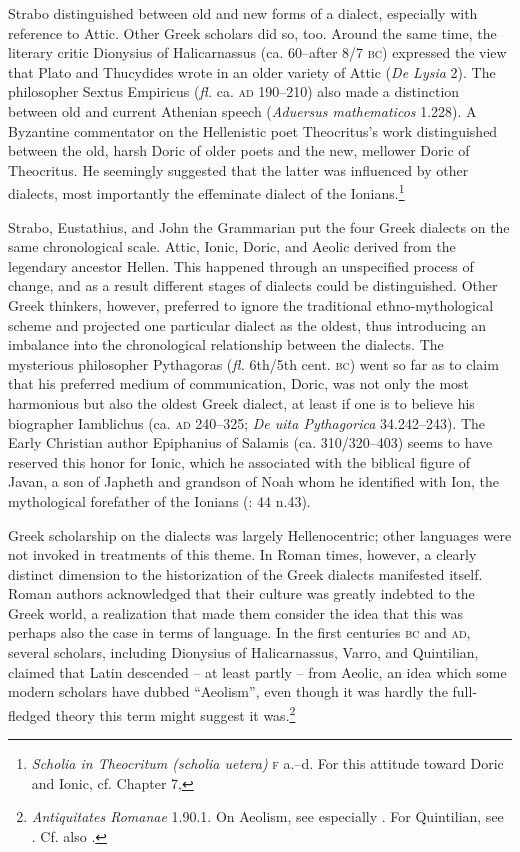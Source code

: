Strabo distinguished between old and new forms of a dialect, especially with reference to Attic. Other Greek scholars did so, too. Around the same time, the literary critic Dionysius of Halicarnassus (ca. 60–after 8/7 \textsc{bc}) expressed the view that Plato and Thucydides wrote in an older variety of Attic (\textit{De Lysia} 2). The philosopher Sextus Empiricus (\textit{fl.} ca. \textsc{ad} 190–210) also made a distinction between old and current Athenian speech (\textit{Aduersus mathematicos} 1.228). A Byzantine commentator on the Hellenistic poet Theocritus’s work distinguished between the old, harsh Doric of older poets and the new, mellower Doric of Theocritus. He seemingly suggested that the latter was influenced by other dialects, most importantly the effeminate dialect of the Ionians.\footnote{\textit{Scholia in Theocritum (scholia uetera)} \textsc{f} a.–d. For this attitude toward Doric and Ionic, cf. Chapter 7, }

Strabo, Eustathius, and John the Grammarian put the four Greek dialects on the same chronological scale. Attic, Ionic, Doric, and Aeolic derived from the legendary ancestor Hellen. This happened through an unspecified process of change, and as a result different stages of dialects could be distinguished. Other Greek thinkers, however, preferred to ignore the traditional ethno-mythological scheme and projected one particular dialect as the oldest, thus introducing an imbalance into the chronological relationship between the dialects. The mysterious philosopher Pythagoras (\textit{fl.} 6th/5th cent. \textsc{bc}) went so far as to claim that his preferred medium of communication, Doric, was not only the most harmonious but also the oldest Greek dialect, at least if one is to believe his biographer Iamblichus (ca. \textsc{ad} 240–325; \textit{De uita Pythagorica} 34.242–243). The Early Christian author Epiphanius of Salamis (ca. 310/320–403) seems to have reserved this honor for Ionic, which he associated with the biblical figure of Javan, a son of Japheth and grandson of Noah whom he identified with Ion, the mythological forefather of the Ionians (\citealt{VanRooy2013}: 44 n.43).

Greek scholarship on the dialects was largely Hellenocentric; other languages were not invoked in treatments of this theme. In Roman times, however, a clearly distinct dimension to the historization of the Greek dialects manifested itself. Roman authors acknowledged that their culture was greatly indebted to the Greek world, a realization that made them consider the idea that this was perhaps also the case in terms of language. In the first centuries \textsc{bc} and \textsc{ad}, several scholars, including Dionysius of Halicarnassus, Varro, and Quintilian, claimed that Latin descended – at least partly – from Aeolic, an idea which some modern scholars have dubbed “Aeolism”, even though it was hardly the full-fledged theory this term might suggest it was.\footnote{\textit{Antiquitates Romanae} 1.90.1. On Aeolism, see especially \citet[]{Stevens2006}. For Quintilian, see \citet[149]{Fogen2000}. Cf. also \citet[117--119]{Schopsdau1992}.}

